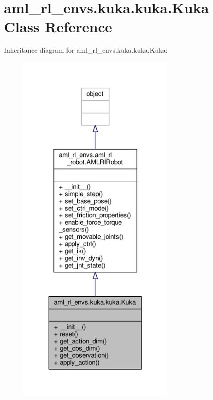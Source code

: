 \hypertarget{classaml__rl__envs_1_1kuka_1_1kuka_1_1_kuka}{\section{aml\-\_\-rl\-\_\-envs.\-kuka.\-kuka.\-Kuka Class Reference}
\label{classaml__rl__envs_1_1kuka_1_1kuka_1_1_kuka}
}


Inheritance diagram for aml\-\_\-rl\-\_\-envs.\-kuka.\-kuka.\-Kuka\-:
\nopagebreak
\begin{figure}[H]
\begin{center}
\leavevmode
\includegraphics[width=222pt]{classaml__rl__envs_1_1kuka_1_1kuka_1_1_kuka__inherit__graph}
\end{center}
\end{figure}


